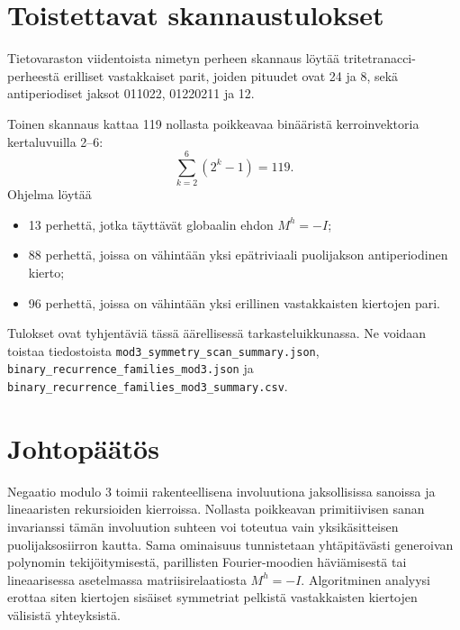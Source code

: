 \documentclass[11pt,a4paper]{article}
\begin{document}
\section{Toistettavat skannaustulokset}
Tietovaraston viidentoista nimetyn perheen skannaus löytää tritetranacci-perheestä erilliset vastakkaiset parit, joiden pituudet ovat 24 ja 8, sekä antiperiodiset jaksot 011022, 01220211 ja 12.

Toinen skannaus kattaa 119 nollasta poikkeavaa binääristä kerroinvektoria kertaluvuilla 2--6:
\[
\sum_{k=2}^{6}(2^k-1)=119.
\]
Ohjelma löytää
\begin{itemize}
\item 13 perhettä, jotka täyttävät globaalin ehdon $M^h=-I$;
\item 88 perhettä, joissa on vähintään yksi epätriviaali puolijakson antiperiodinen kierto;
\item 96 perhettä, joissa on vähintään yksi erillinen vastakkaisten kiertojen pari.
\end{itemize}
Tulokset ovat tyhjentäviä tässä äärellisessä tarkasteluikkunassa. Ne voidaan toistaa tiedostoista \nolinkurl{mod3_symmetry_scan_summary.json}, \nolinkurl{binary_recurrence_families_mod3.json} ja \nolinkurl{binary_recurrence_families_mod3_summary.csv}.

\section*{Johtopäätös}
Negaatio modulo 3 toimii rakenteellisena involuutiona jaksollisissa sanoissa ja lineaaristen rekursioiden kierroissa. Nollasta poikkeavan primitiivisen sanan invarianssi tämän involuution suhteen voi toteutua vain yksikäsitteisen puolijaksosiirron kautta. Sama ominaisuus tunnistetaan yhtäpitävästi generoivan polynomin tekijöitymisestä, parillisten Fourier-moodien häviämisestä tai lineaarisessa asetelmassa matriisirelaatiosta $M^h=-I$. Algoritminen analyysi erottaa siten kiertojen sisäiset symmetriat pelkistä vastakkaisten kiertojen välisistä yhteyksistä.
\end{document}

